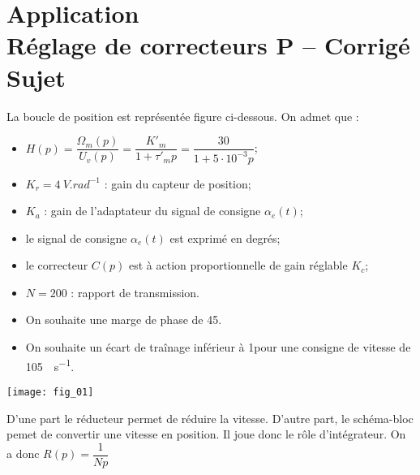 \chapter*{Application  \\ 
Réglage de correcteurs P -- 
\ifprof Corrigé \else Sujet \fi}

\iflivret {} \else
\ifprof  {} \else \fi
\fi

\setcounter{question}{0}


La boucle de position est représentée figure ci-dessous. On admet que : 
\begin{itemize}
\item $H(p)=\dfrac{\Omega_m(p)}{U_v(p)}=\dfrac{K'_m}{1+\tau'_m p}=\dfrac{30}{1+5\cdot 10^{-3} p}$;
\item $K_r = \SI{4}{V.rad^{-1}}$ : gain du capteur de position;
\item $K_a$ : gain de l'adaptateur du signal de consigne $\alpha_e(t)$;
\item le signal de consigne $\alpha_e(t)$ est exprimé en degrés;
\item le correcteur $C(p)$ est à action proportionnelle de gain réglable $K_c$;
\item $N=200$ : rapport de transmission.
\end{itemize}

\begin{obj}
\begin{itemize}
\item On souhaite une marge de phase de 45\degres.
\item On souhaite un écart de traînage inférieur à 1\degres pour une consigne de vitesse de \SI{105}{\degres.s^{-1}}. 
\end{itemize}
\end{obj}

\begin{center}
\texttt{[image: fig\_01]}
\end{center}

\ifprof
\begin{corrige}
D'une part le réducteur permet de réduire la vitesse. D'autre part, le schéma-bloc pemet de convertir une vitesse en position. Il joue donc le rôle d'intégrateur. On a donc $R(p)=\dfrac{1}{Np}$
\end{corrige}
\else
\fi


